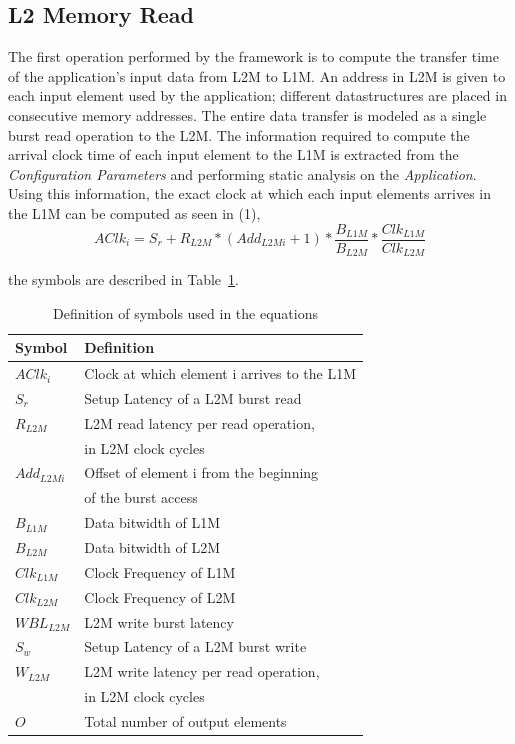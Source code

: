 \subsection{L2 Memory Read}
\label{ssec:l2_read_model}
The first operation performed by the framework is to compute the transfer time of the application's input data from L2M to L1M. An address in L2M is given to each input element used by the application; different datastructures are placed in consecutive memory addresses. The entire data transfer is modeled as a single burst read operation to the L2M. The information required to compute the arrival clock time of each input element to the L1M is extracted from the \textit{Configuration Parameters} and performing static analysis on the \textit{Application}.
Using this information, the exact clock at which each input elements arrives in the L1M can be computed as seen in (1),
\begin{equation}
AClk_i = S_r + R_{L2M} * (Add_{L2Mi}+1) * \frac{B_{L1M}}{B_{L2M}} * \frac{Clk_{L1M}}{Clk_{L2M}}
\end{equation}

the symbols are described in Table~\ref{table:equation}.

\begin{table}[]
\begin{tabular}{|l|l|}
\hline
\textbf{Symbol} & \textbf{Definition}                                           \\ \hline
$AClk_i$           & Clock at which element i arrives to the L1M                \\ \hline
$S_r$             & Setup Latency of a L2M burst read                          \\ \hline
$R_{L2M}$       & L2M read latency per read operation, \\ &in L2M clock cycles   \\ \hline
$Add_{L2Mi}$     & Offset of element i from the beginning \\ &of the burst access \\ \hline
$B_{L1M}$        & Data bitwidth of L1M                                       \\ \hline
$B_{L2M}$        & Data bitwidth of L2M                                       \\ \hline
$Clk_{L1M}$      & Clock Frequency of L1M                                     \\ \hline
$Clk_{L2M}$      & Clock Frequency of L2M                                     \\ \hline
$WBL_{L2M}$      & L2M write burst latency                                    \\ \hline
$S_w$             & Setup Latency of a L2M burst write                         \\ \hline
$W_{L2M}$       & L2M write latency per read operation, \\ &in L2M clock cycles  \\ \hline
$O$                 & Total number of output elements                            \\ \hline
\end{tabular}
\caption{Definition of symbols used in the equations}
\label{table:equation}
\end{table}

